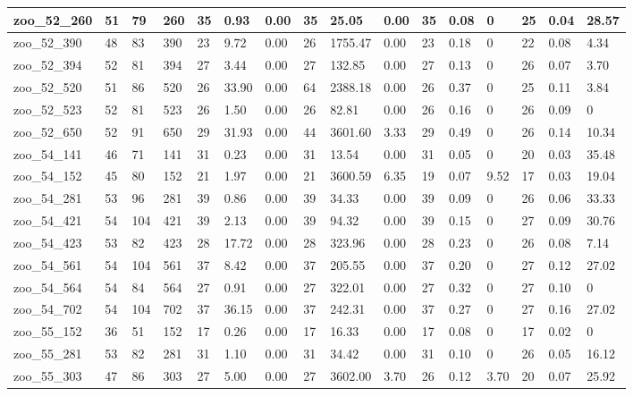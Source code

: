 \begin{landscape}
\begin{longtable}{llllllllllllllll}
zoo\_52\_260 & 51 & 79 & 260 & 35 & 0.93 & 0.00 & 35 & 25.05 & 0.00 & 35 & 0.08 & 0 & 25 & 0.04 & 28.57 \\ \hline 
zoo\_52\_390 & 48 & 83 & 390 & 23 & 9.72 & 0.00 & 26 & 1755.47 & 0.00 & 23 & 0.18 & 0 & 22 & 0.08 & 4.34 \\ \hline 
zoo\_52\_394 & 52 & 81 & 394 & 27 & 3.44 & 0.00 & 27 & 132.85 & 0.00 & 27 & 0.13 & 0 & 26 & 0.07 & 3.70 \\ \hline 
zoo\_52\_520 & 51 & 86 & 520 & 26 & 33.90 & 0.00 & 64 & 2388.18 & 0.00 & 26 & 0.37 & 0 & 25 & 0.11 & 3.84 \\ \hline 
zoo\_52\_523 & 52 & 81 & 523 & 26 & 1.50 & 0.00 & 26 & 82.81 & 0.00 & 26 & 0.16 & 0 & 26 & 0.09 & 0 \\ \hline 
zoo\_52\_650 & 52 & 91 & 650 & 29 & 31.93 & 0.00 & 44 & 3601.60 & 3.33 & 29 & 0.49 & 0 & 26 & 0.14 & 10.34 \\ \hline 
zoo\_54\_141 & 46 & 71 & 141 & 31 & 0.23 & 0.00 & 31 & 13.54 & 0.00 & 31 & 0.05 & 0 & 20 & 0.03 & 35.48 \\ \hline 
zoo\_54\_152 & 45 & 80 & 152 & 21 & 1.97 & 0.00 & 21 & 3600.59 & 6.35 & 19 & 0.07 & 9.52 & 17 & 0.03 & 19.04 \\ \hline 
zoo\_54\_281 & 53 & 96 & 281 & 39 & 0.86 & 0.00 & 39 & 34.33 & 0.00 & 39 & 0.09 & 0 & 26 & 0.06 & 33.33 \\ \hline 
zoo\_54\_421 & 54 & 104 & 421 & 39 & 2.13 & 0.00 & 39 & 94.32 & 0.00 & 39 & 0.15 & 0 & 27 & 0.09 & 30.76 \\ \hline 
zoo\_54\_423 & 53 & 82 & 423 & 28 & 17.72 & 0.00 & 28 & 323.96 & 0.00 & 28 & 0.23 & 0 & 26 & 0.08 & 7.14 \\ \hline 
zoo\_54\_561 & 54 & 104 & 561 & 37 & 8.42 & 0.00 & 37 & 205.55 & 0.00 & 37 & 0.20 & 0 & 27 & 0.12 & 27.02 \\ \hline 
zoo\_54\_564 & 54 & 84 & 564 & 27 & 0.91 & 0.00 & 27 & 322.01 & 0.00 & 27 & 0.32 & 0 & 27 & 0.10 & 0 \\ \hline 
zoo\_54\_702 & 54 & 104 & 702 & 37 & 36.15 & 0.00 & 37 & 242.31 & 0.00 & 37 & 0.27 & 0 & 27 & 0.16 & 27.02 \\ \hline 
zoo\_55\_152 & 36 & 51 & 152 & 17 & 0.26 & 0.00 & 17 & 16.33 & 0.00 & 17 & 0.08 & 0 & 17 & 0.02 & 0 \\ \hline 
zoo\_55\_281 & 53 & 82 & 281 & 31 & 1.10 & 0.00 & 31 & 34.42 & 0.00 & 31 & 0.10 & 0 & 26 & 0.05 & 16.12 \\ \hline 
zoo\_55\_303 & 47 & 86 & 303 & 27 & 5.00 & 0.00 & 27 & 3602.00 & 3.70 & 26 & 0.12 & 3.70 & 20 & 0.07 & 25.92 \\ \hline 

\end{longtable}
\end{landscape}
